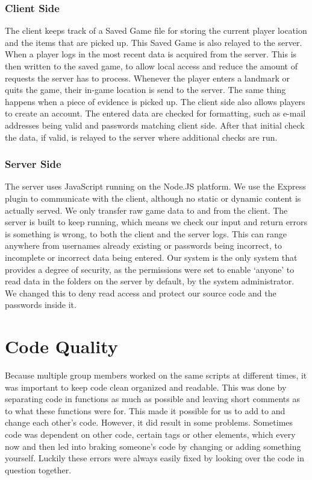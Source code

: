 \documentclass{article}
\begin{document}
\subsubsection{Client Side}
The client keeps track of a Saved Game file for storing the current player location and the items that are picked up. This Saved Game is also relayed to the server. When a player logs in the most recent data is acquired from the server. This is then written to the saved game, to allow local access and reduce the amount of requests the server has to process. Whenever the player enters a landmark or quits the game, their in-game location is send to the server. The same thing happens when a piece of evidence is picked up. The client side also allows players to create an account. The entered data are checked for formatting, such as e-mail addresses being valid and passwords matching client side. After that initial check the data, if valid, is relayed to the server where additional checks are run.
\subsubsection{Server Side}
The server uses JavaScript running on the Node.JS platform. We use the Express plugin to communicate with the client, although no static or dynamic content is actually served. We only transfer raw game data to and from the client. The server is built to keep running, which means we check our input and return errors is something is wrong, to both the client and the server logs. This can range anywhere from usernames already existing or passwords being incorrect, to incomplete or incorrect data being entered. Our system is the only system that provides a degree of security, as the permissions were set to enable ‘anyone’ to read data in the folders on the server by default, by the system administrator. We changed this to deny read access and protect our source code and the passwords inside it.

\newpage
\section{Code Quality}
Because multiple group members worked on the same scripts at different times, it was important to keep code clean organized and readable. This was done by separating code in functions as much as possible and leaving short comments as to what these functions were for. This made it possible for us to add to and change each other’s code. However, it did result in some problems. Sometimes code was dependent on other code, certain tags or other elements, which every now and then led into braking someone’s code by changing or adding something yourself. Luckily these errors were always easily fixed by looking over the code in question together.
\end{document}
